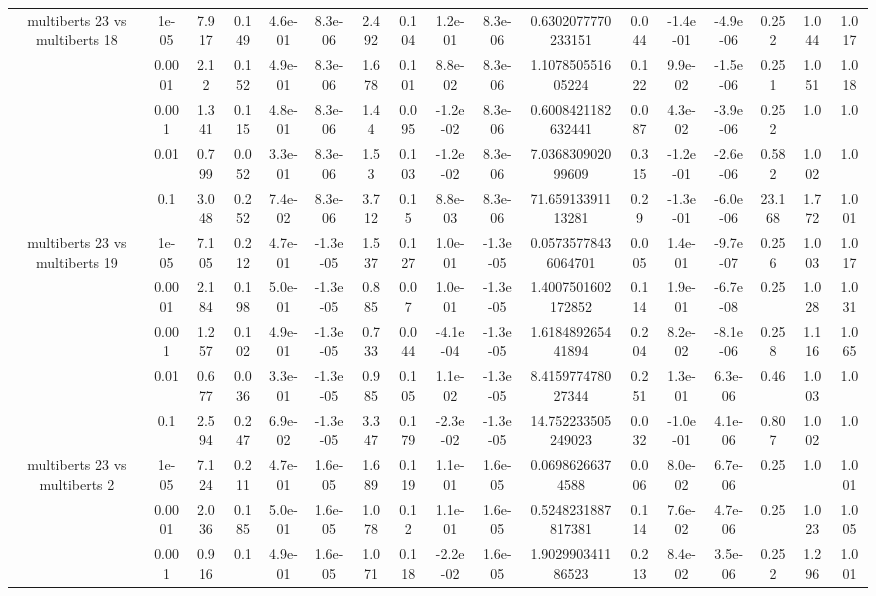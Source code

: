 \begin{tabular}{|c|c|c|c|c|c|c|c|c|c|c|c|c|c|c|c|c|}
\hline
\multirow{5}{*}{multiberts 23 vs multiberts 18} & 1e-05 & 7.917 & 0.149 & 4.6e-01 & 8.3e-06 & 2.492 & 0.104 & 1.2e-01 & 8.3e-06 & 0.6302077770233151 & 0.044 & -1.4e-01 & -4.9e-06 & 0.252 & 1.044 & 1.017 \\
 & 0.0001 & 2.12 & 0.152 & 4.9e-01 & 8.3e-06 & 1.678 & 0.101 & 8.8e-02 & 8.3e-06 & 1.107850551605224 & 0.122 & 9.9e-02 & -1.5e-06 & 0.251 & 1.051 & 1.018 \\
 & 0.001 & 1.341 & 0.115 & 4.8e-01 & 8.3e-06 & 1.44 & 0.095 & -1.2e-02 & 8.3e-06 & 0.6008421182632441 & 0.087 & 4.3e-02 & -3.9e-06 & 0.252 & 1.0 & 1.0 \\
 & 0.01 & 0.799 & 0.052 & 3.3e-01 & 8.3e-06 & 1.53 & 0.103 & -1.2e-02 & 8.3e-06 & 7.036830902099609 & 0.315 & -1.2e-01 & -2.6e-06 & 0.582 & 1.002 & 1.0 \\
 & 0.1 & 3.048 & 0.252 & 7.4e-02 & 8.3e-06 & 3.712 & 0.15 & 8.8e-03 & 8.3e-06 & 71.65913391113281 & 0.29 & -1.3e-01 & -6.0e-06 & 23.168 & 1.772 & 1.001 \\
\hline
\multirow{5}{*}{multiberts 23 vs multiberts 19} & 1e-05 & 7.105 & 0.212 & 4.7e-01 & -1.3e-05 & 1.537 & 0.127 & 1.0e-01 & -1.3e-05 & 0.05735778436064701 & 0.005 & 1.4e-01 & -9.7e-07 & 0.256 & 1.003 & 1.017 \\
 & 0.0001 & 2.184 & 0.198 & 5.0e-01 & -1.3e-05 & 0.885 & 0.07 & 1.0e-01 & -1.3e-05 & 1.4007501602172852 & 0.114 & 1.9e-01 & -6.7e-08 & 0.25 & 1.028 & 1.031 \\
 & 0.001 & 1.257 & 0.102 & 4.9e-01 & -1.3e-05 & 0.733 & 0.044 & -4.1e-04 & -1.3e-05 & 1.618489265441894 & 0.204 & 8.2e-02 & -8.1e-06 & 0.258 & 1.116 & 1.065 \\
 & 0.01 & 0.677 & 0.036 & 3.3e-01 & -1.3e-05 & 0.985 & 0.105 & 1.1e-02 & -1.3e-05 & 8.415977478027344 & 0.251 & 1.3e-01 & 6.3e-06 & 0.46 & 1.003 & 1.0 \\
 & 0.1 & 2.594 & 0.247 & 6.9e-02 & -1.3e-05 & 3.347 & 0.179 & -2.3e-02 & -1.3e-05 & 14.752233505249023 & 0.032 & -1.0e-01 & 4.1e-06 & 0.807 & 1.002 & 1.0 \\
\hline
\multirow{5}{*}{multiberts 23 vs multiberts 2} & 1e-05 & 7.124 & 0.211 & 4.7e-01 & 1.6e-05 & 1.689 & 0.119 & 1.1e-01 & 1.6e-05 & 0.06986266374588 & 0.006 & 8.0e-02 & 6.7e-06 & 0.25 & 1.0 & 1.001 \\
 & 0.0001 & 2.036 & 0.185 & 5.0e-01 & 1.6e-05 & 1.078 & 0.12 & 1.1e-01 & 1.6e-05 & 0.5248231887817381 & 0.114 & 7.6e-02 & 4.7e-06 & 0.25 & 1.023 & 1.005 \\
 & 0.001 & 0.916 & 0.1 & 4.9e-01 & 1.6e-05 & 1.071 & 0.118 & -2.2e-02 & 1.6e-05 & 1.902990341186523 & 0.213 & 8.4e-02 & 3.5e-06 & 0.252 & 1.296 & 1.001 \\

\end{tabular}

